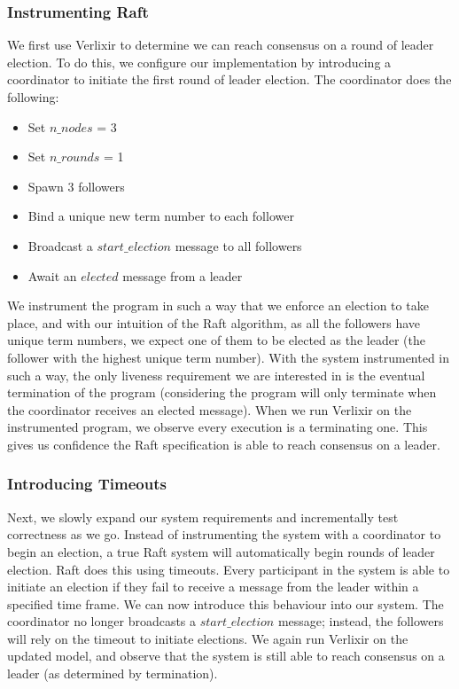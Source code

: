 \subsubsection{Instrumenting Raft}
We first use Verlixir to determine we can reach consensus on a round of leader election. To do this, we configure our implementation by introducing a coordinator to initiate the first round of leader election. The coordinator does the following:
\begin{itemize}
    \item Set $n\_nodes$ = 3
    \item Set $n\_rounds$ = 1
    \item Spawn 3 followers
    \item Bind a unique new term number to each follower
    \item Broadcast a $start\_election$ message to all followers
    \item Await an $elected$ message from a leader
\end{itemize} 
We instrument the program in such a way that we enforce an election to take place, and with our intuition of the Raft algorithm, as all the followers have unique term numbers, we expect one of them to be elected as the leader (the follower with the highest unique term number). With the system instrumented in such a way, the only liveness requirement we are interested in is the eventual termination of the program (considering the program will only terminate when the coordinator receives an elected message). When we run Verlixir on the instrumented program, we observe every execution is a terminating one. This gives us confidence the Raft specification is able to reach consensus on a leader.
\par
\subsubsection{Introducing Timeouts}
Next, we slowly expand our system requirements and incrementally test correctness as we go. Instead of instrumenting the system with a coordinator to begin an election, a true Raft system will automatically begin rounds of leader election. Raft does this using timeouts. Every participant in the system is able to initiate an election if they fail to receive a message from the leader within a specified time frame. We can now introduce this behaviour into our system. The coordinator no longer broadcasts a $start\_election$ message; instead, the followers will rely on the timeout to initiate elections. We again run Verlixir on the updated model, and observe that the system is still able to reach consensus on a leader (as determined by termination).
\par
